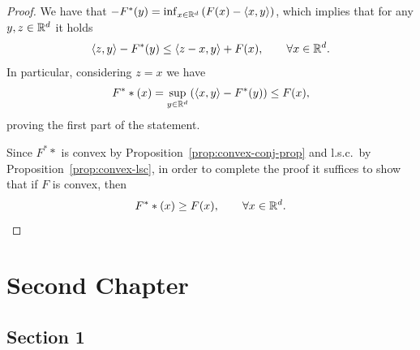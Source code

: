 \documentclass{report}
\begin{document}
\begin{proof}
	We have that $-F^*(y)=\inf_{x\in\mathbb{R}^d} \left(F(x)-\langle x,y\rangle\right)$, which implies that for any $y,z\in\mathbb{R}^d$ it holds 
	\begin{equation}
		\langle z,y\rangle - F^*(y) \le \langle z-x,y\rangle +F(x), \qquad \forall x\in\mathbb{R}^d.
	\end{equation}
	In particular, considering $z=x$ we have 
	\begin{equation}
		F^**(x) = \sup_{y\in\mathbb{R}^d} \left(\langle x,y\rangle - F^*(y)\right) \le F(x),
	\end{equation}
	proving the first part of the statement.
	
	Since $F^**$ is convex by Proposition~\ref{prop:convex-conj-prop} and l.s.c.~by Proposition~\ref{prop:convex-lsc}, in order to complete the proof it suffices to show that if $F$ is convex, then 
	\begin{equation}
		F^**(x)\ge F(x),\qquad \forall x\in\mathbb{R}^d.
	\end{equation}

\end{proof}

	
\chapter{Second Chapter}
\section{Section 1}

\printbibliography
\end{document}
